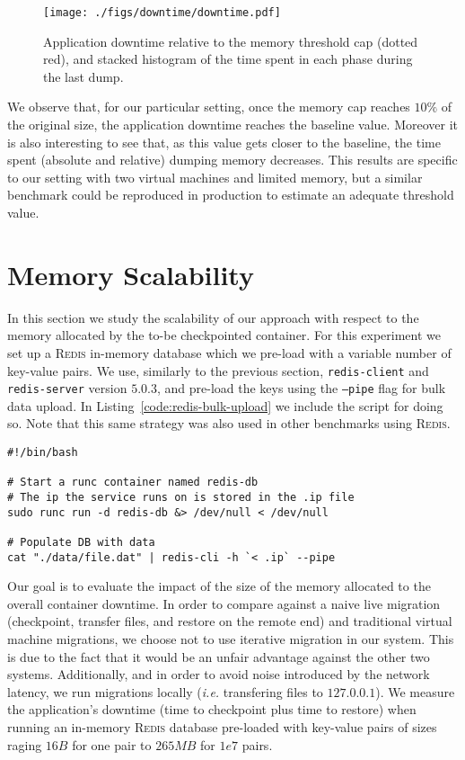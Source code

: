 \begin{figure}[h!]
    \centering
    \texttt{[image: ./figs/downtime/downtime.pdf]}
    \caption[Application Downtime Relative to Threshold]{Application downtime relative to the memory threshold cap (dotted red), and stacked histogram of the time spent in each phase during the last dump.\label{fig:downtime}}
\end{figure}

We observe that, for our particular setting, once the memory cap reaches $10\%$ of the original size, the application downtime reaches the baseline value.
Moreover it is also interesting to see that, as this value gets closer to the baseline, the time spent (absolute and relative) dumping memory decreases.
This results are specific to our setting with two virtual machines and limited memory, but a similar benchmark could be reproduced in production to estimate an adequate threshold value.

\section{Memory Scalability} \label{sec:eval-memory}

In this section we study the scalability of our approach with respect to the memory allocated by the to-be checkpointed container.
For this experiment we set up a \textsc{Redis} in-memory database which we pre-load with a variable number of key-value pairs.
We use, similarly to the previous section, \texttt{redis-client} and \texttt{redis-server} version $5.0.3$, and pre-load the keys using the \texttt{--pipe} flag for bulk data upload.
In Listing~\ref{code:redis-bulk-upload} we include the script for doing so.
Note that this same strategy was also used in other benchmarks using \textsc{Redis}.
\begin{lstlisting}[style=Bash,caption={Snippet for bulk data upload to a Redis database.},label={code:redis-bulk-upload}]
#!/bin/bash

# Start a runc container named redis-db
# The ip the service runs on is stored in the .ip file
sudo runc run -d redis-db &> /dev/null < /dev/null

# Populate DB with data
cat "./data/file.dat" | redis-cli -h `< .ip` --pipe
\end{lstlisting}

Our goal is to evaluate the impact of the size of the memory allocated to the overall container downtime.
In order to compare against a naive live migration (checkpoint, transfer files, and restore on the remote end) and traditional virtual machine migrations, we choose not to use iterative migration in our system.
This is due to the fact that it would be an unfair advantage against the other two systems.
Additionally, and in order to avoid noise introduced by the network latency, we run migrations locally (\textit{i.e.} transfering files to $127.0.0.1$).
We measure the application's downtime (time to checkpoint plus time to restore) when running an in-memory \textsc{Redis} database pre-loaded with key-value pairs of sizes raging $16 B$ for one pair to $265 MB$ for $1e7$ pairs.

